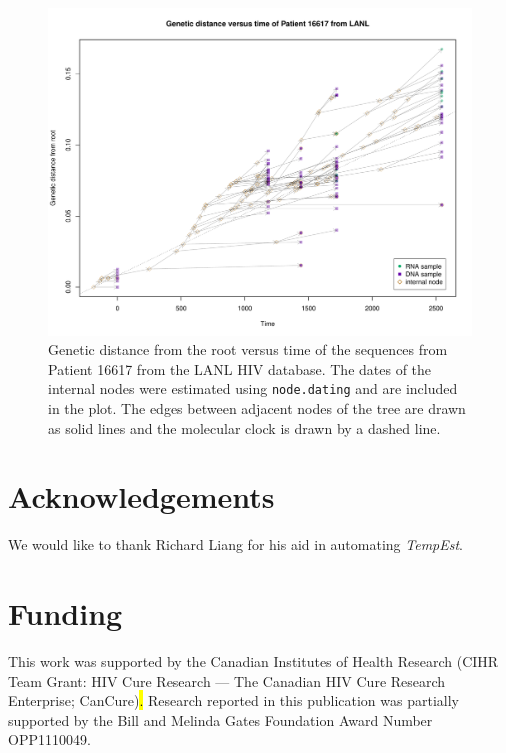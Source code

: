 \documentclass{bioinfo}
\newcommand{\code}[1]{{\tt #1}}
\newcommand{\edit}[1]{\hl{#1}}
\begin{document}
\begin{figure}[b]
	\vspace{-10pt}
	\centering
	\includegraphics[width=\columnwidth]{patient_16617}
	\caption[Genetic distance versus time plot]{Genetic distance from the root versus time of the sequences from Patient 16617 from the LANL HIV database. The dates of the internal nodes were estimated using \code{node.dating} and are included in the plot. The edges between adjacent nodes of the tree are drawn as solid lines and the molecular clock is drawn by a dashed line.}
	\label{fig:pat16617}
\end{figure}

\vspace*{-18pt}

\section*{Acknowledgements} \label{sec:ackn}
We would like to thank Richard Liang for his aid in automating \emph{TempEst}.

\vspace*{-18pt}

\section*{Funding} \label{sec:fund}
This work was supported by the Canadian Institutes of Health Research (CIHR Team Grant: HIV Cure Research --- The Canadian HIV Cure Research Enterprise; CanCure)\edit{.}%
Research reported in this publication was partially supported by the Bill and Melinda Gates Foundation Award Number OPP1110049.\edit{ }
\end{document}
